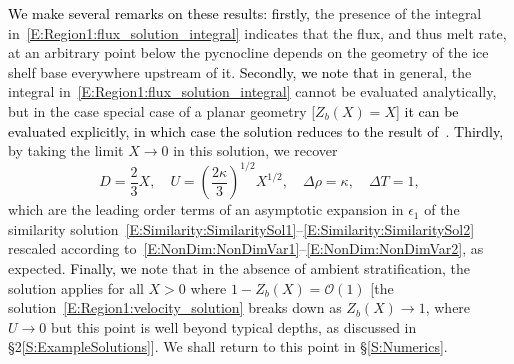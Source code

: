 \documentclass[openacc]{rsproca_new}%
\newcommand{\red}[1]{{\color{red} #1}}
\newcommand{\blue}[1]{{\color{blue} #1}}
\newcommand{\rout}[1]{\red{\st{#1}}}\newcommand{\ab}[1]{\textcolor{Green}{#1}}\newcommand{\about}[1]{\textcolor{Cyan}{\sout{#1}}}
\renewcommand{\rout}[1]{{}} %
\renewcommand{\blue}[1]{{\textcolor{black}{#1}}} %
\renewcommand{\red}[1]{{}} %
\newcommand{\epsone}{\epsilon_{1}} %
\begin{document}
\blue{We make several remarks on these results: firstly,} \rout{Note that }the presence of the integral in~\eqref{E:Region1:flux_solution_integral} indicates that the flux, and thus melt rate, at an arbitrary point below the pycnocline depends on the geometry of the ice shelf base everywhere upstream of it. \blue{Secondly, we note that }\rout{I}\blue{i}n general, the integral in~\eqref{E:Region1:flux_solution_integral} cannot be evaluated analytically, but in the case special case of a planar geometry [$Z_b(X) = X$] \blue{it can be evaluated explicitly, in which case the solution reduces to the result of}~\cite{Lazeroms2019JPhysOcean}. \blue{Thirdly, }\rout{Note that }by taking the limit $X \to 0$ in this solution, we recover 
\begin{equation}\label{E:Region1:dimensionless_similarity}
D = \frac{2}{3}X, \quad U = \left(\frac{2\kappa}{3}\right)^{1/2}X^{1/2}, \quad \Delta \rho = \kappa, \quad \Delta T = 1,
\end{equation} 
which are the leading order terms of an asymptotic expansion in $\epsone$ of the similarity solution~\eqref{E:Similarity:SimilaritySol1}--\eqref{E:Similarity:SimilaritySol2} rescaled according to~\eqref{E:NonDim:NonDimVar1}--\eqref{E:NonDim:NonDimVar2}, as expected. \blue{Finally, we }\rout{N}\blue{n}ote that in the absence of ambient stratification, the solution applies for all $X> 0$ where $1 - Z_b(X) = \mathcal{O}(1)$ [the solution~\eqref{E:Region1:velocity_solution} breaks down as $Z_b(X) \to 1$, where $U \to 0$ but this point is well beyond typical depths, as discussed in \S2\ref{S:ExampleSolutions}]. We shall return to this point in \S\ref{S:Numerics}.
\end{document}
